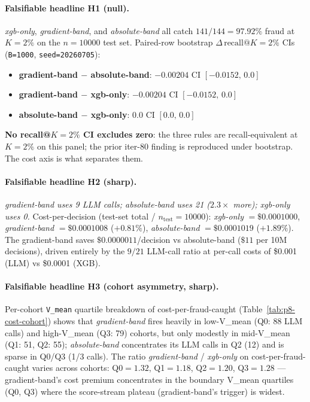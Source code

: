 \documentclass{article}
\begin{document}
\paragraph{Falsifiable headline H1 (null).}
\textit{xgb-only}, \textit{gradient-band}, and \textit{absolute-band}
all catch $141/144=97.92\%$ fraud at $K{=}2\%$ on the
$n{=}10000$ test set. Paired-row bootstrap
$\Delta\,\mathrm{recall}@K{=}2\%$ CIs (\texttt{B=1000},
\texttt{seed=20260705}):
\begin{itemize}
  \item \textbf{gradient-band $-$ absolute-band}: $-0.00204$
        CI $[-0.0152,\,0.0]$
  \item \textbf{gradient-band $-$ xgb-only}:    $-0.00204$
        CI $[-0.0152,\,0.0]$
  \item \textbf{absolute-band $-$ xgb-only}:     $0.0$
        CI $[0.0,\,0.0]$
\end{itemize}
\textbf{No recall@$K{=}2\%$ CI excludes zero}: the three rules are
recall-equivalent at $K{=}2\%$ on this panel; the prior iter-80 finding
is reproduced under bootstrap. The cost axis is what separates them.

\paragraph{Falsifiable headline H2 (sharp).}
\textit{gradient-band uses 9 LLM calls; \textit{absolute-band} uses 21
($2.3\times$ more); \textit{xgb-only} uses 0.}
Cost-per-decision (test-set total / $n_\mathrm{test}=10000$):
\textit{xgb-only} $=\$0.0001000$,
\textit{gradient-band} $=\$0.0001008$ ($+0.81\%$),
\textit{absolute-band} $=\$0.0001019$ ($+1.89\%$).
The gradient-band saves $\$0.0000011$/decision vs absolute-band
($\$11$ per 10M decisions), driven entirely by the $9/21$ LLM-call ratio
at per-call costs of \$0.001 (LLM) vs \$0.0001 (XGB).

\paragraph{Falsifiable headline H3 (cohort asymmetry, sharp).}
Per-cohort \texttt{V\_mean} quartile breakdown of cost-per-fraud-caught
(Table~\ref{tab:p8-cost-cohort}) shows that
\textit{gradient-band} fires heavily in low-V\_mean (Q0: 88 LLM calls)
and high-V\_mean (Q3: 79) cohorts, but only modestly in mid-V\_mean
(Q1: 51, Q2: 55); \textit{absolute-band} concentrates its LLM calls in
Q2 (12) and is sparse in Q0/Q3 (1/3 calls). The ratio
\textit{gradient-band} / \textit{xgb-only} on cost-per-fraud-caught
varies across cohorts: Q0$=1.32$, Q1$=1.18$, Q2$=1.20$, Q3$=1.28$
--- gradient-band's cost premium concentrates in the boundary V\_mean
quartiles (Q0, Q3) where the score-stream plateau (gradient-band's
trigger) is widest.
\end{document}
